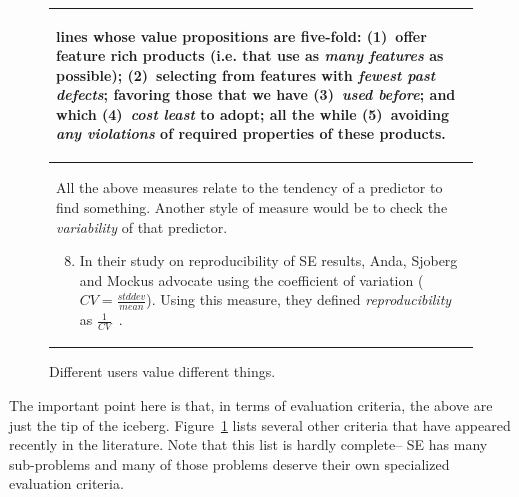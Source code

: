 \documentclass[table, xcdraw, sigconf,review, anonymous]{acmart}
\begin{document}
\begin{figure}[!t]
\begin{tabular}{p{.95\linewidth}}
\begin{enumerate}[leftmargin=0.4cm]
lines whose value propositions are five-fold:
(1)~offer feature rich products (i.e. that
use as {\em many features} as possible);
(2)~selecting from features with {\em fewest past defects};
favoring those that we have (3)~{\em used before}; and which
(4)~{\em cost
least} to adopt; all the while (5)~avoiding {\em any violations} of
required properties of these
products.
\end{enumerate}
\\ \hline
\rowcolor{gray!20}
All the above measures relate to the tendency of a predictor to find something. Another style
of measure would be to check the {\em variability} of that predictor.
\begin{enumerate}[leftmargin=0.4cm]
\setcounter{enumi}{7}
\item
In their study on reproducibility of SE results,
 Anda, Sjoberg and Mockus advocate using the coefficient of variation ($CV=\frac{stddev}{mean}$).
Using this measure, they defined {\em reproducibility} as $\frac{1}{CV}$~\cite{mockus09}.
\end{enumerate}\\\hline
\end{tabular}
\caption[Different users value different things.]{Different users value different things.
}\label{fig:goals}
\end{figure}



The important point here is that, in terms of evaluation criteria,  the above are just the tip of the iceberg.
Figure~\ref{fig:goals} lists several other criteria that have appeared recently in the literature. Note that this list is hardly complete-- SE has many sub-problems and many of those
problems deserve their own specialized evaluation criteria.
\end{document}
